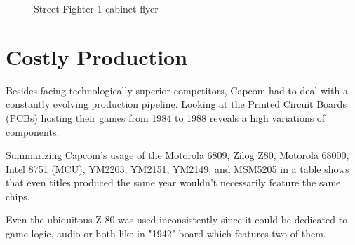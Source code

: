 \begin{figure}[H]
\caption*{Street Fighter 1 cabinet flyer}
\end{figure}


\section{Costly Production}
Besides facing technologically superior competitors, Capcom had to deal with a constantly evolving production pipeline. Looking at the Printed Circuit Boards (PCBs) hosting their games from 1984 to 1988 reveals a high variations of components.

Summarizing Capcom's usage of the Motorola 6809, Zilog Z80, Motorola 68000, Intel 8751 (MCU), YM2203, YM2151, YM2149, and MSM5205 in a table shows that even titles produced the same year wouldn't necessarily feature the same chips. 

Even the ubiquitous Z-80 was used inconsistently since it could be dedicated to game logic, audio or both like in "1942" board which features two of them.




